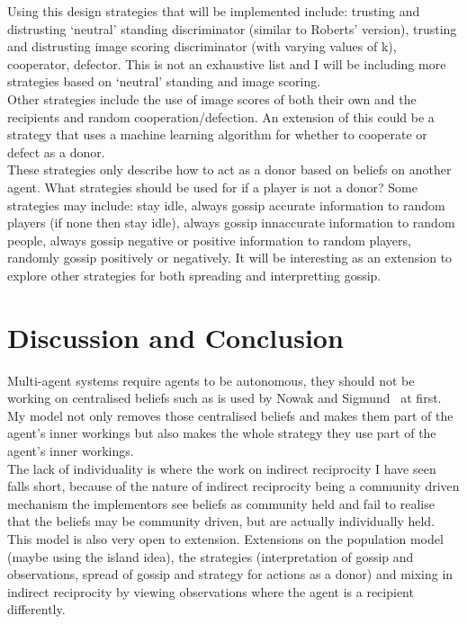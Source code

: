 \documentclass[twoside,twocolumn]{article}
\begin{document}
Using this design strategies that will be implemented include: trusting and distrusting `neutral' standing discriminator (similar to Roberts' version), trusting and distrusting image scoring discriminator (with varying values of k), cooperator, defector. This is not an exhaustive list and I will be including more strategies based on `neutral' standing and image scoring.\\
Other strategies include the use of image scores of both their own and the recipients and random cooperation/defection. An extension of this could be a strategy that uses a machine learning algorithm for whether to cooperate or defect as a donor.\\
These strategies only describe how to act as a donor based on beliefs on another agent. What strategies should be used for if a player is not a donor? Some strategies may include: stay idle, always gossip accurate information to random players (if none then stay idle), always gossip innaccurate information to random people, always gossip negative or positive information to random players, randomly gossip positively or negatively. It will be interesting as an extension to explore other strategies for both spreading and interpretting gossip.



\section{Discussion and Conclusion}
Multi-agent systems require agents to be autonomous, they should not be working on centralised beliefs such as is used by Nowak and Sigmund~\cite{evol_indirect_image} at first. My model not only removes those centralised beliefs and makes them part of the agent's inner workings but also makes the whole strategy they use part of the agent's inner workings. \\
The lack of individuality is where the work on indirect reciprocity I have seen falls short, because of the nature of indirect reciprocity being a community driven mechanism the implementors see beliefs as community held and fail to realise that the beliefs may be community driven, but are actually individually held.\\
This model is also very open to extension. Extensions on the population model (maybe using the island idea), the strategies (interpretation of gossip and observations, spread of gossip and strategy for actions as a donor) and mixing in indirect reciprocity by viewing observations where the agent is a recipient differently.




{}


\end{document}
